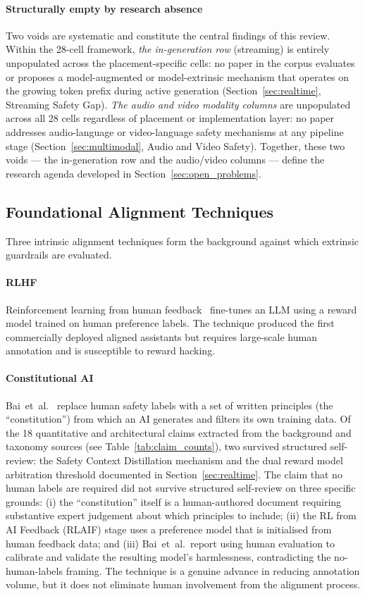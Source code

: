 \paragraph{Structurally empty by research absence}
Two voids are systematic and constitute the central findings of this review.
Within the 28-cell framework, \emph{the in-generation row} (streaming) is entirely unpopulated across the placement-specific cells: no paper in the corpus evaluates or proposes a model-augmented or model-extrinsic mechanism that operates on the growing token prefix during active generation (Section~\ref{sec:realtime}, Streaming Safety Gap).
\emph{The audio and video modality columns} are unpopulated across all 28 cells regardless of placement or implementation layer: no paper addresses audio-language or video-language safety mechanisms at any pipeline stage (Section~\ref{sec:multimodal}, Audio and Video Safety).
Together, these two voids --- the in-generation row and the audio/video columns --- define the research agenda developed in Section~\ref{sec:open_problems}.

\subsection{Foundational Alignment Techniques}

Three intrinsic alignment techniques form the background against which extrinsic
guardrails are evaluated.

\paragraph{RLHF}
Reinforcement learning from human feedback~\cite{ouyang2022training} fine-tunes an
LLM using a reward model trained on human preference labels.
The technique produced the first commercially deployed aligned assistants but
requires large-scale human annotation and is susceptible to reward hacking.

\paragraph{Constitutional AI}
Bai~et~al.~\cite{bai2022constitutional} replace human safety labels with a set of
written principles (the ``constitution'') from which an AI generates and filters
its own training data.
Of the 18 quantitative and architectural claims extracted from the background and
taxonomy sources (see Table~\ref{tab:claim_counts}), two survived structured
self-review: the Safety Context Distillation mechanism and the dual reward model
arbitration threshold documented in Section~\ref{sec:realtime}.
The claim that no human labels are required did not survive structured self-review
on three specific grounds: (i) the ``constitution'' itself is a
human-authored document requiring substantive expert judgement about which principles
to include; (ii) the RL from AI Feedback (RLAIF) stage uses a preference model that
is initialised from human feedback data; and (iii) Bai~et~al.\ report using human
evaluation to calibrate and validate the resulting model's harmlessness, contradicting
the no-human-labels framing.
The technique is a genuine advance in reducing annotation volume, but it does not
eliminate human involvement from the alignment process.

